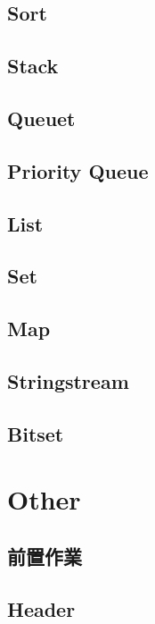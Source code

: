 \subsection{Sort}


\subsection{Stack}


\subsection{Queuet}


\subsection{Priority Queue}


\subsection{List}


\subsection{Set}


\subsection{Map}


\subsection{Stringstream}


\subsection{Bitset}






\section{Other}

\subsection{前置作業}


\subsection{Header}
